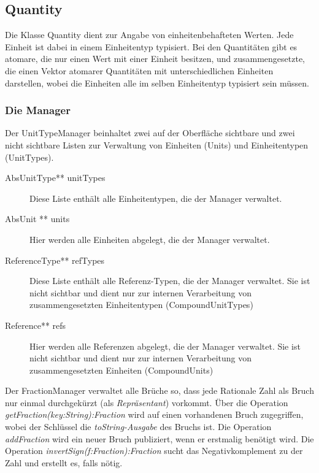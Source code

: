 \subsection{Quantity}
Die Klasse Quantity dient zur Angabe von einheitenbehafteten Werten. Jede Einheit ist dabei in einem Einheitentyp typisiert. Bei den Quantitäten gibt es atomare, die nur einen Wert mit einer Einheit besitzen, und zusammengesetzte, die einen Vektor atomarer Quantitäten mit unterschiedlichen Einheiten darstellen, wobei die Einheiten alle im selben Einheitentyp typisiert sein müssen.


\subsubsection{Die Manager}


Der UnitTypeManager beinhaltet zwei auf der Oberfläche sichtbare und zwei nicht sichtbare Listen zur Verwaltung von Einheiten (Units) und Einheitentypen (UnitTypes).

\begin{description}
\item[AbsUnitType** unitTypes] Diese Liste enthält alle Einheitentypen, die der Manager verwaltet.
\item[AbsUnit ** units] Hier werden alle Einheiten abgelegt, die der Manager verwaltet.
\item[ReferenceType** refTypes] Diese Liste enthält alle Referenz-Typen, die der Manager verwaltet. Sie ist nicht sichtbar und dient nur zur internen Verarbeitung von zusammengesetzten Einheitentypen (CompoundUnitTypes)
\item[Reference** refs] Hier werden alle Referenzen abgelegt, die der Manager verwaltet. Sie ist nicht sichtbar und dient nur zur internen Verarbeitung von zusammengesetzten Einheiten (CompoundUnits)
\end{description}

\label{FractionManager}

Der FractionManager verwaltet alle Brüche so, dass jede Rationale Zahl als Bruch nur einmal durchgekürzt (als \emph{Repräsentant}) vorkommt.
Über die Operation \textit{getFraction(key:String):Fraction} wird auf einen vorhandenen Bruch zugegriffen, wobei der Schlüssel die \textit{toString-Ausgabe} des Bruchs ist.
Die Operation \textit{addFraction} wird ein neuer Bruch publiziert, wenn er erstmalig benötigt wird. Die Operation \textit{invertSign(f:Fraction):Fraction} sucht das Negativkomplement zu der Zahl und erstellt es, falls nötig.

